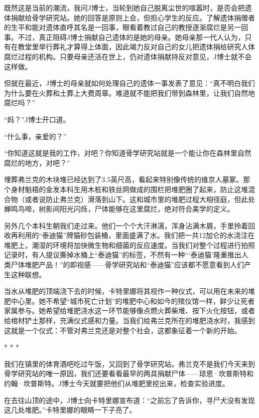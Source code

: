 \documentclass[12pt,oneside]{book}
\begin{document}
既然这是当前的潮流，我问J博士，当轮到她自己脱离尘世的喧嚣时，是否会把遗体捐献给骨学研究站。她的回答是原则上会，但担心学生的反应。了解遗体捐赠者的生平和能对遗体直呼其名是一回事，眼看着教过自己的教授逐渐腐烂是另一回事。不过，真正阻碍J博士捐献自己遗体的是她的母亲。她母亲那一代人认为，只有在教堂里举行葬礼才算得上体面，因此竭力反对自己的女儿把遗体捐给研究人体腐烂过程的机构。只要母亲还活在世上，仍对遗体捐献持反对意见，J博士就不会这样做。

但就在最近，J博士的母亲就如何处理自己的遗体一事发表了意见：“真不明白我们为什么要在火葬和土葬上大费周章。难道就不能把我们带到森林里，让我们自然地腐烂吗？”

“妈？”J博士开口道。

“什么事，亲爱的？”

“你知道这就是我的工作，对吧？你知道骨学研究站就是一个能让你在森林里自然腐烂的地方，对吧？”

埋葬弗兰克的木块堆已经达到了3.5英尺高，看起来特别像传统的维京人墓冢。那个身材魁梧的金发本科生用木桩和铁丝网做成的围栏把堆肥圈了起来，防止这堆混合物（或者说防止弗兰克）滑落到山下。这和城市里的堆肥过程大相径庭，但此处蝉鸣鸟啼，树影间阳光闪烁，尸体能够在这里腐烂，绝对符合美学的定义。

另外几个本科生朝我们走过来。他们一个个大汗淋漓，浑身沾满木屑，手里拎着回收再利用的“泰迪猫”牌猫砂包装桶，里面盛满了水。我们把一共12加仑的水浇注在堆肥上，潮湿的环境将加快微生物和细菌的反应速度。当我们对整个过程进行拍照记录时，有人提议撕掉水桶上“泰迪猫”的标签，不然有一种“‘泰迪猫’隆重推出人类尸体堆肥产品！”的即视感——骨学研究站和“泰迪猫”应该都不愿意看到人们产生这种联想。

当水从堆肥的顶端浇下去的时候，卡特里娜将其视作一种仪式，可以用在未来的堆肥中心里。她不希望“城市死亡计划”的堆肥中心和如今的殡仪馆一样，鲜少让死者家属参与。她希望给堆肥浇水这一环节能够像点燃火葬柴堆、按下火化按钮，或者给棺材铲土那样，充满仪式感和力量。当我们给弗兰克所在的堆肥浇水时，我感到这就是一个仪式：不管对弗兰克还是对整个社会，这都象征着一个新的开始。

\begin{center}
* * *
\end{center}

我们在镇里的体育酒吧吃过午饭，又回到了骨学研究站。弗兰克不是我们今天来到骨学研究站的唯一原因，我们还要看看最早的两具捐献尸体——琼恩·坎普斯特和约翰·坎普斯特。J博士今天就要把他们从堆肥里挖出来，检查实验进度。

在去往山顶的途中，J博士向卡特里娜宣布道：“之前忘了告诉你，寻尸犬没有发现这几处堆肥。”卡特里娜的眼睛一下子亮了。
\end{document}
